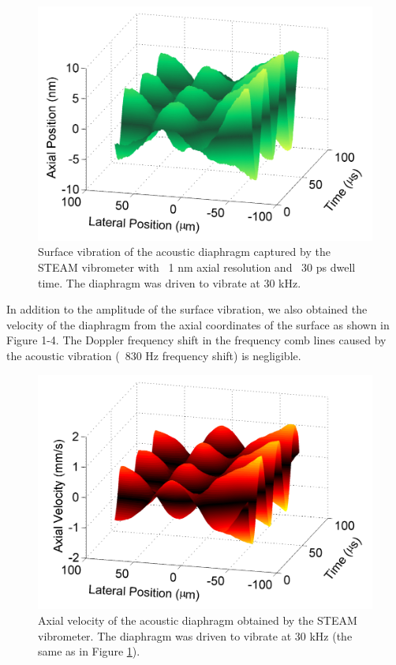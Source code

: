 \begin{figure}[htb!]
\centering
\includegraphics[scale=1]{APL_2011/Figure3.png}
\caption{Surface vibration of the acoustic diaphragm captured by the STEAM vibrometer with ~1 nm axial resolution and ~30 ps dwell time. The diaphragm was driven to vibrate at 30 kHz.}
\label{fig:APL_2011_Figure3}
\end{figure}

In addition to the amplitude of the surface vibration, we also obtained the velocity of the diaphragm from the axial coordinates of the surface as shown in Figure 1-4. The Doppler frequency shift in the frequency comb lines caused by the acoustic vibration (~830 Hz frequency shift) is negligible.

\begin{figure}[htb!]
\centering
\includegraphics[scale=1]{APL_2011/Figure4.png}
\caption{Axial velocity of the acoustic diaphragm obtained by the STEAM vibrometer. The diaphragm was driven to vibrate at 30 kHz (the same as in Figure \ref{fig:APL_2011_Figure3}).}
\label{fig:APL_2011_Figure4}
\end{figure}

